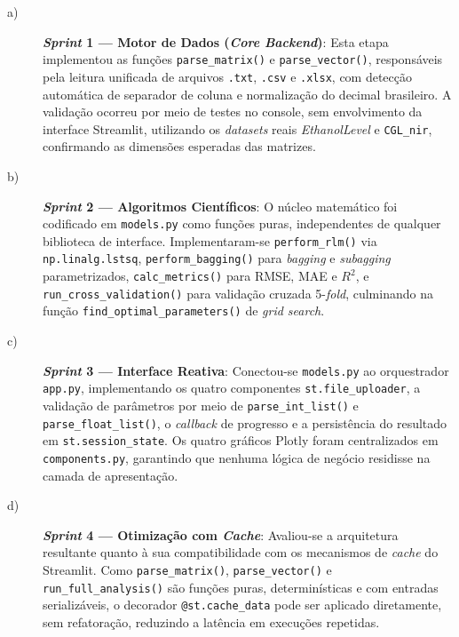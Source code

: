 \begin{description}

\item[a)] \textbf{\textit{Sprint} 1 --- Motor de Dados (\textit{Core Backend})}:
Esta etapa implementou as funções \texttt{parse\_matrix()} e
\texttt{parse\_vector()}, responsáveis pela leitura unificada de arquivos
\texttt{.txt}, \texttt{.csv} e \texttt{.xlsx}, com detecção automática de
separador de coluna e normalização do decimal brasileiro. A validação ocorreu
por meio de testes no console, sem envolvimento da interface Streamlit,
utilizando os \textit{datasets} reais \textit{EthanolLevel} e
\texttt{CGL\_nir}, confirmando as dimensões esperadas das matrizes.

\item[b)] \textbf{\textit{Sprint} 2 --- Algoritmos Científicos}: O núcleo
matemático foi codificado em \texttt{models.py} como funções puras,
independentes de qualquer biblioteca de interface. Implementaram-se
\texttt{perform\_rlm()} via \texttt{np.linalg.lstsq}, \texttt{perform\_bagging()}
para \textit{bagging} e \textit{subagging} parametrizados, \texttt{calc\_metrics()}
para RMSE, MAE e $R^2$, e \texttt{run\_cross\_validation()} para validação
cruzada 5-\textit{fold}, culminando na função \texttt{find\_optimal\_parameters()}
de \textit{grid search}.

\item[c)] \textbf{\textit{Sprint} 3 --- Interface Reativa}: Conectou-se
\texttt{models.py} ao orquestrador \texttt{app.py}, implementando os quatro
componentes \texttt{st.file\_uploader}, a validação de parâmetros por meio de
\texttt{parse\_int\_list()} e \texttt{parse\_float\_list()}, o \textit{callback}
de progresso e a persistência do resultado em \texttt{st.session\_state}. Os
quatro gráficos Plotly foram centralizados em \texttt{components.py}, garantindo
que nenhuma lógica de negócio residisse na camada de apresentação.

\item[d)] \textbf{\textit{Sprint} 4 --- Otimização com \textit{Cache}}: Avaliou-se
a arquitetura resultante quanto à sua compatibilidade com os mecanismos de
\textit{cache} do Streamlit. Como \texttt{parse\_matrix()}, \texttt{parse\_vector()}
e \texttt{run\_full\_analysis()} são funções puras, determinísticas e com
entradas serializáveis, o decorador \texttt{@st.cache\_data} pode ser aplicado
diretamente, sem refatoração, reduzindo a latência em execuções repetidas.

\end{description}

